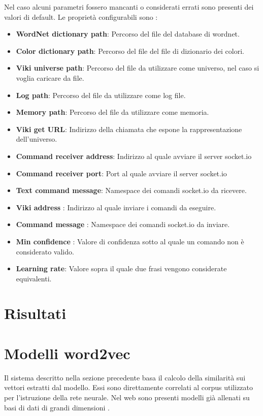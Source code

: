 \documentclass[twoside]{supsistudent}
\begin{document}
Nel caso alcuni parametri fossero mancanti o considerati errati sono presenti dei valori di default.
Le proprietà configurabili sono :
\begin{itemize}

  \item \textbf{WordNet dictionary path}: Percorso del file del database di wordnet.
   \item \textbf{Color dictionary path}: Percorso del file del file di dizionario dei colori.
      \item \textbf{Viki universe path}: Percorso del file da utilizzare come universo, nel caso si voglia caricare da file.
      \item \textbf{Log path}: Percorso del file da utilizzare come log file.
      \item \textbf{Memory path}: Percorso del file da utilizzare come memoria.
      \item \textbf{Viki get URL}: Indirizzo della chiamata che espone la rappresentazione dell'universo.
      \item \textbf{Command receiver address}: Indirizzo al quale avviare il server socket.io
      \item \textbf{Command receiver port}: Port al quale avviare il server socket.io
      \item \textbf{Text command message}: Namespace dei comandi socket.io da ricevere.
      \item \textbf{Viki address }: Indirizzo al quale inviare i comandi da eseguire.
      \item \textbf{Command message }: Namespace dei comandi socket.io da inviare.
      \item \textbf{Min confidence }: Valore di confidenza sotto al quale un comando non è considerato valido.
      \item \textbf{Learning rate}: Valore sopra il quale due frasi vengono considerate equivalenti.
\end{itemize}
\chapter{Risultati}

\chapter{Modelli word2vec}
Il sistema descritto nella sezione precedente basa il calcolo della similarità sui vettori estratti dal modello. Essi sono direttamente correlati al corpus \cite{corpus} utilizzato per l'istruzione della rete neurale. Nel web sono presenti modelli già allenati su basi di dati di grandi dimensioni \cite{trained_models}.
\end{document}

